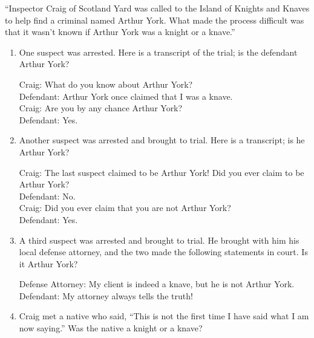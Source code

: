 \documentclass[12pt,letterpaper,boxed,cm]{hmcpset}
\begin{document}
\begin{solution}
    \vfill
\end{solution}
\newpage

\begin{problem} ``Inspector Craig of Scotland Yard was called to the Island of Knights and Knaves to help find a criminal named Arthur York. What made the process difficult was that it wasn't known if Arthur York was a knight or a knave.''
    \begin{enumerate}[label=\Alph*.]
        \item One suspect was arrested. Here is a transcript of the trial; is the defendant Arthur York?
        \begin{adjustwidth}{1cm}{}
            Craig: What do you know about Arthur York?\\
            Defendant: Arthur York once claimed that I was a knave.\\
            Craig: Are you by any chance Arthur York?\\
            Defendant: Yes.
        \end{adjustwidth}
        \item Another suspect was arrested and brought to trial. Here is a transcript; is he Arthur York?
        \begin{adjustwidth}{1cm}{}
            Craig: The last suspect claimed to be Arthur York! Did you ever claim to be Arthur York?\\
            Defendant: No.\\
            Craig: Did you ever claim that you are not Arthur York?\\
            Defendant: Yes.
        \end{adjustwidth}
        \item A third suspect was arrested and brought to trial. He brought with him his local defense attorney, and the two made the following statements in court. Is it Arthur York?
        \begin{adjustwidth}{1cm}{}
            Defense Attorney:  My client is indeed a knave, but he is not Arthur York.\\
            Defendant: My attorney always tells the truth!
        \end{adjustwidth}
        \item Craig met a native who said, “This is not the first time I have said what I am now saying.” Was the native a knight or a knave?
    \end{enumerate}
\end{problem}
\end{document}
